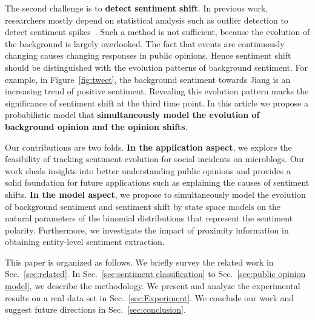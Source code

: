 \documentclass[runningheads]{llncs}
\begin{document}
The second challenge is to \textbf{detect sentiment shift}.
In previous work, researchers mostly depend on statistical analysis such as outlier detection to detect sentiment spikes~\cite{Giachanou2016sentichange,Giachanou2017sentichange,Giachanou2016sentitime}.
Such a method is not sufficient, because the evolution of the background is largely overlooked.
The fact that events are continuously changing causes changing responses in public opinions. Hence sentiment shift should be distinguished with the evolution patterns of background sentiment.  
For example, in Figure~\ref{fig:tweet}, the background sentiment towards Jiang is an increasing trend of positive sentiment. Revealing this evolution pattern marks the significance of sentiment shift at the third time point. %
In this article we propose a probabilistic model that \textbf{simultaneously model the evolution of background opinion and the opinion shifts}.

Our contributions are two folds. 
\textbf{In the application aspect}, we explore the feasibility of tracking sentiment evolution for social incidents on microblogs. Our work sheds insights into better understanding public opinions and provides a solid foundation for future applications such as explaining the causes of sentiment shifts. 
\textbf{In the model aspect}, we propose to simultaneously model the evolution of background sentiment and sentiment shift by state space models on the natural parameters of the binomial distributions that represent the sentiment polarity. 
Furthermore, we investigate the impact of proximity information in obtaining entity-level sentiment extraction.


This paper is organized as follows. We briefly survey the related work in Sec.~\ref{sec:related}. In Sec.~\ref{sec:sentiment classification} to Sec.~\ref{sec:public opinion model}, we describe the methodology. We present and analyze the experimental results on a real data set in Sec.~\ref{sec:Experiment}. We conclude our work and suggest future directions in Sec.~\ref{sec:conclusion}.
\end{document}
